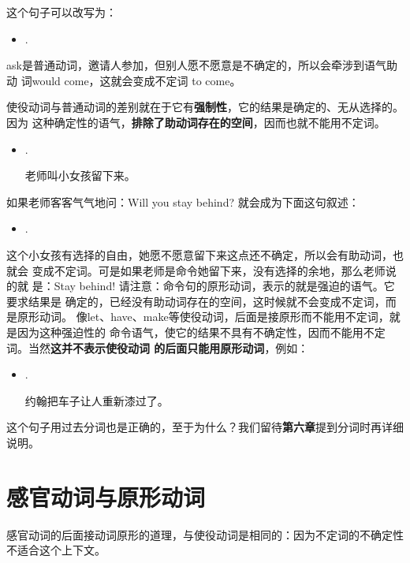 这个句子可以改写为：

\begin{itemize}
\item  {}  .
\end{itemize}

ask是普通动词，邀请人参加，但别人愿不愿意是不确定的，所以会牵涉到语气助动
词would come，这就会变成不定词 to come。

使役动词与普通动词的差别就在于它有\textbf{强制性}，它的结果是确定的、无从选择的。因为
这种确定性的语气，\textbf{排除了助动词存在的空间}，因而也就不能用不定词。

\begin{itemize}
\item  {}   .

  老师叫小女孩留下来。
\end{itemize}

如果老师客客气气地问：Will you stay behind? 就会成为下面这句叙述：
\begin{itemize}
\item {}   .
\end{itemize}
这个小女孩有选择的自由，她愿不愿意留下来这点还不确定，所以会有助动词，也就会
变成不定词。可是如果老师是命令她留下来，没有选择的余地，那么老师说的就
是：Stay behind! 请注意：命令句的原形动词，表示的就是强迫的语气。它要求结果是
确定的，已经没有助动词存在的空间，这时候就不会变成不定词，而是原形动词。
像let、have、make等使役动词，后面是接原形而不能用不定词，就是因为这种强迫性的
命令语气，使它的结果不具有不确定性，因而不能用不定词。当然\textbf{这并不表示使役动词
  的后面只能用原形动词}，例如：
\begin{itemize}
\item {}   .

  约翰把车子让人重新漆过了。
\end{itemize}
这个句子用过去分词也是正确的，至于为什么？我们留待\textbf{第六章}提到分词时再详细说明。

\section{感官动词与原形动词}

感官动词的后面接动词原形的道理，与使役动词是相同的：因为不定词的不确定性不适合这个上下文。

